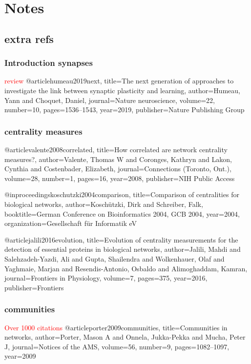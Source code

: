 \chapter{Notes}
\section{extra refs}


\subsection{Introduction synapses}
\textcolor{red}{review}
@article{humeau2019next,
  title={The next generation of approaches to investigate the link between synaptic plasticity and learning},
  author={Humeau, Yann and Choquet, Daniel},
  journal={Nature neuroscience},
  volume={22},
  number={10},
  pages={1536--1543},
  year={2019},
  publisher={Nature Publishing Group}
}

\subsection{centrality measures}
@article{valente2008correlated,
  title={How correlated are network centrality measures?},
  author={Valente, Thomas W and Coronges, Kathryn and Lakon, Cynthia and Costenbader, Elizabeth},
  journal={Connections (Toronto, Ont.)},
  volume={28},
  number={1},
  pages={16},
  year={2008},
  publisher={NIH Public Access}
}

@inproceedings{koschutzki2004comparison,
  title={Comparison of centralities for biological networks},
  author={Kosch{\"u}tzki, Dirk and Schreiber, Falk},
  booktitle={German Conference on Bioinformatics 2004, GCB 2004},
  year={2004},
  organization={Gesellschaft f{\"u}r Informatik eV}
}

@article{jalili2016evolution,
  title={Evolution of centrality measurements for the detection of essential proteins in biological networks},
  author={Jalili, Mahdi and Salehzadeh-Yazdi, Ali and Gupta, Shailendra and Wolkenhauer, Olaf and Yaghmaie, Marjan and Resendis-Antonio, Osbaldo and Alimoghaddam, Kamran},
  journal={Frontiers in Physiology},
  volume={7},
  pages={375},
  year={2016},
  publisher={Frontiers}
}

\subsection{communities}
\textcolor{red}{Over 1000 citations}
@article{porter2009communities,
  title={Communities in networks},
  author={Porter, Mason A and Onnela, Jukka-Pekka and Mucha, Peter J},
  journal={Notices of the AMS},
  volume={56},
  number={9},
  pages={1082--1097},
  year={2009}
}

